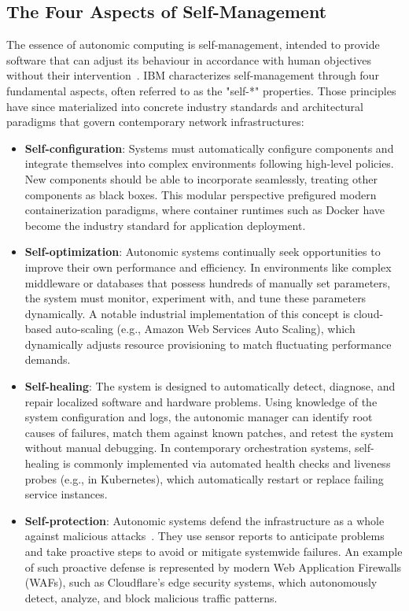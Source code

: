 \subsection{The Four Aspects of Self-Management}
The essence of autonomic computing is self-management, intended to provide software that can adjust its behaviour in accordance with human objectives without their intervention~\cite{kephart2003vision}. IBM characterizes self-management through four fundamental aspects, often referred to as the "self-*" properties. Those principles have since materialized into concrete industry standards and architectural paradigms that govern contemporary network infrastructures:

\begin{itemize}
    \item \textbf{Self-configuration}: Systems must automatically configure components and integrate themselves into complex environments following high-level policies. New components should be able to incorporate seamlessly, treating other components as black boxes. This modular perspective prefigured modern containerization paradigms, where container runtimes such as Docker have become the industry standard for application deployment.
    \item \textbf{Self-optimization}: Autonomic systems continually seek opportunities to improve their own performance and efficiency. In environments like complex middleware or databases that possess hundreds of manually set parameters, the system must monitor, experiment with, and tune these parameters dynamically. A notable industrial implementation of this concept is cloud-based auto-scaling (e.g., Amazon Web Services Auto Scaling), which dynamically adjusts resource provisioning to match fluctuating performance demands.
    \item \textbf{Self-healing}: The system is designed to automatically detect, diagnose, and repair localized software and hardware problems. Using knowledge of the system configuration and logs, the autonomic manager can identify root causes of failures, match them against known patches, and retest the system without manual debugging. In contemporary orchestration systems, self-healing is commonly implemented via automated health checks and liveness probes (e.g., in Kubernetes), which automatically restart or replace failing service instances.
    \item \textbf{Self-protection}: Autonomic systems defend the infrastructure as a whole against malicious attacks~\cite{yuan2014systematic}. They use sensor reports to anticipate problems and take proactive steps to avoid or mitigate systemwide failures. An example of such proactive defense is represented by modern Web Application Firewalls (WAFs), such as Cloudflare’s edge security systems, which autonomously detect, analyze, and block malicious traffic patterns.
\end{itemize}


